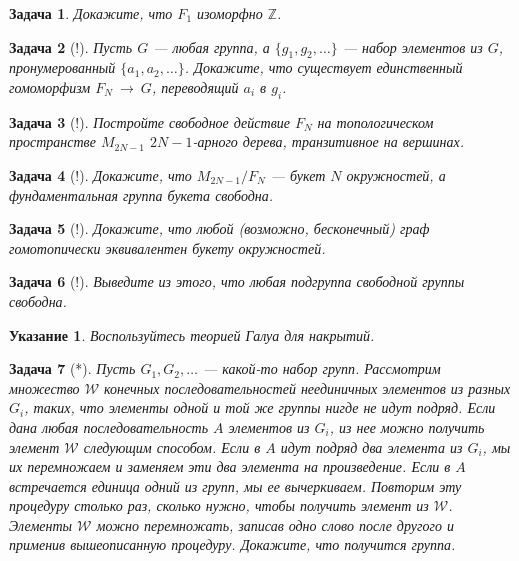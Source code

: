 \documentclass[12pt]{book}
\newcommand{\arrow}{{\:\longrightarrow\:}}
\def\Z{{\mathbb Z}}
\theoremstyle{upshape}
\newtheorem{zadacha}{Задача}[chapter]
\theoremstyle{generic}
\theoremstyle{upshapenonumber}
\newtheorem{ukazanie}{Указание}[section]
\newcommand{\следствие}{%
     \refstepcounter{teorema}
     {\noindent\bf Следствие \thechapter.\arabic{teorema}:\ }}
\newcommand{\пример}{%
     \refstepcounter{teorema}
     {\noindent\bf Пример \thechapter.\arabic{teorema}:\ }}
\newcommand{\лемма}{%
     \refstepcounter{teorema}
     {\noindent\bf Лемма \thechapter.\arabic{teorema}:\ }}
\newcommand{\теорема}{%
     \refstepcounter{teorema}
     {\noindent\bf Теорема \thechapter.\arabic{teorema}:\ }}
\newcommand{\утверждение}{%
     \refstepcounter{teorema}
     {\noindent\bf Утверждение \thechapter.\arabic{teorema}:\ }}
\begin{document}
{\begin{zadacha}
Докажите, что $F_1$ изоморфно $\Z$.
\end{zadacha}

\begin{zadacha}[!]
Пусть $G$ --- любая группа, а
$\{g_1, g_2, \dots \}$ --- набор элементов
из $G$, пронумерованный $\{a_1, a_2, \dots\}$.
Докажите, что существует единственный гомоморфизм $F_N\arrow G$,
переводящий $a_i$ в $g_i$.
\end{zadacha}

\begin{zadacha}[!] Постройте свободное действие $F_N$ 
на топологическом пространстве $M_{2N-1}$ $2N-1$-арного дерева,
транзитивное на вершинах.
\end{zadacha}

\begin{zadacha}[!] Докажите, что 
$M_{2N-1}/F_N$ --- букет $N$ окружностей,
а фундаментальная группа букета свободна.
\end{zadacha}

\begin{zadacha}[!]
Докажите, что любой (возможно, бесконечный) граф гомотопически
эквивалентен букету окружностей.
\end{zadacha}

\begin{zadacha}[!]
Выведите из этого, что любая подгруппа свободной группы
свободна.
\end{zadacha}

\begin{ukazanie}
Воспользуйтесь теорией Галуа для накрытий.
\end{ukazanie}

\begin{zadacha}[*] 
Пусть $G_1,G_2,\dots$ --- какой-то набор
групп. Рассмотрим множество ${\mathcal W}$ 
конечных последовательностей неединичных 
элементов из разных $G_i$, таких, что 
элементы одной и той же группы
нигде не идут подряд. Если дана
любая последовательность $A$ элементов
из $G_i$, из нее можно получить элемент
${\mathcal W}$ следующим способом.
Если в $A$ идут подряд два элемента
из $G_i$, мы их перемножаем и заменяем
эти два элемента на произведение. Если
в $A$ встречается единица одний из групп,
мы ее вычеркиваем. Повторим эту процедуру
столько раз, сколько нужно, чтобы получить
элемент из ${\mathcal W}$. Элементы ${\mathcal W}$
можно перемножать, записав одно слово после
другого и применив вышеописанную процедуру.
Докажите, что получится группа.
\end{zadacha}

}
\end{document}
